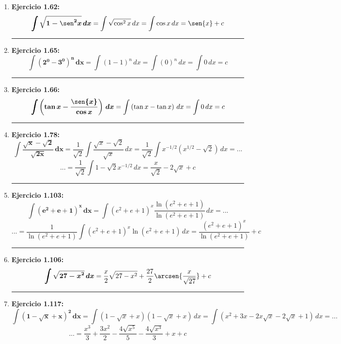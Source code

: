 \documentclass[12pt]{article}
\begin{document}
\begin{enumerate}[label=\textbf{\arabic*)}]
        \hrule %
        \item \textbf{Ejercicio 1.62: } \[\bm{\int \sqrt{1 - \sen^2{x}} \, dx} = \int \sqrt{\cos^2{x}} \, dx = \int \cos{x} \, dx = \sen{x} + c\]


        \newpage\hrule %
        \item \textbf{Ejercicio 1.65: } \[\bm{\int (2^0 - 3^0)^n \, dx} = \int (1 - 1)^n \, dx = \int (0)^n \, dx = \int 0 \, dx = c\]


        \hrule %
        \item \textbf{Ejercicio 1.66: } \[\bm{\int \left(\tan{x} - \frac{\sen{x}}{\cos{x}}\right) \, dx} = \int \left(\tan{x} - \tan{x}\right) \, dx = \int 0 \, dx = c\]


        \hrule %
        \item \textbf{Ejercicio 1.78: } \[\bm{\int \frac{\sqrt{x} - \sqrt{2}}{\sqrt{2x}} \, dx} = \frac{1}{\sqrt{2}}\int \frac{\sqrt{x} - \sqrt{2}}{\sqrt{x}} \, dx = \frac{1}{\sqrt{2}}\int x^{-1/2}(x^{1/2} - \sqrt{2}) \, dx = ...\]
            \[... = \frac{1}{\sqrt{2}}\int 1 - \sqrt{2}x^{-1/2} \, dx = \frac{x}{\sqrt{2}} - 2\sqrt{x} + c\]

        \hrule %
        \item \textbf{Ejercicio 1.103:} \[\bm{\int (e^2 + e + 1)^x \, dx} = \int (e^2 + e + 1)^x \frac{\ln{(e^2 + e + 1)}}{\ln{(e^2 + e + 1)}} \, dx = ...\]
            \[... = \frac{1}{\ln{(e^2 + e + 1)}} \int (e^2 + e + 1)^x \ln{(e^2 + e + 1)} \, dx  = \frac{(e^2 + e + 1)^x}{\ln{(e^2 + e + 1)}} + c\]

        \hrule %
        \item \textbf{Ejercicio 1.106: } \[\bm{\int \sqrt{27 - x^2} \, dx} = \frac{x}{2} \sqrt{27 - x^2} + \frac{27}{2} \arcsen{\frac{x}{\sqrt{27}}} + c\]


        \hrule %
        \item \textbf{Ejercicio 1.117: } \[\bm{\int (1 - \sqrt{x} + x)^2 \, dx} = \int (1 - \sqrt{x} + x)(1 - \sqrt{x} + x) \, dx = \int (x^2 + 3x - 2x\sqrt{x} - 2\sqrt{x} + 1) \, dx = ...\]
            \[... = \frac{x^3}{3} + \frac{3x^2}{2} - \frac{4\sqrt{x^5}}{5} - \frac{4\sqrt{x^3}}{3} + x + c\]

    \end{enumerate}
\end{document}
